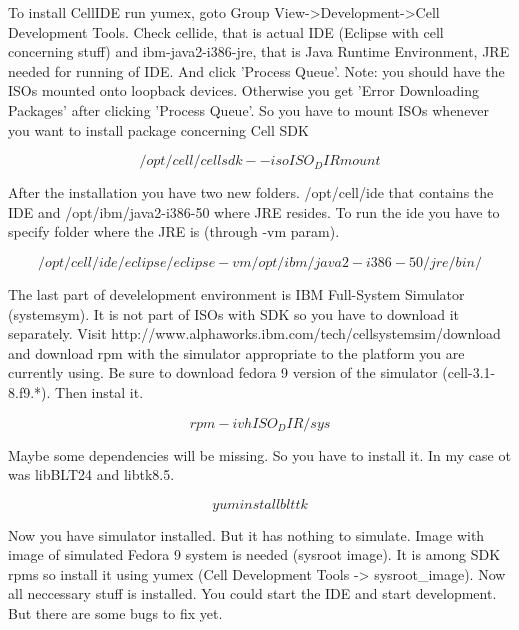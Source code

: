 \documentclass{article}
\begin{document}
To install CellIDE run yumex, goto Group View->Development->Cell Development Tools. Check cellide, that is actual IDE (Eclipse with cell concerning stuff) and ibm-java2-i386-jre, that is Java Runtime Environment, JRE needed for running of IDE. And click 'Process Queue'. Note: you should have the ISOs mounted onto loopback devices. Otherwise you get 'Error Downloading Packages' after clicking 'Process Queue'. So you have to mount ISOs whenever you want to install package concerning Cell SDK

\begin{equation}
/opt/cell/cellsdk --iso ISO_DIR mount
\end{equation}

After the installation you have two new folders. /opt/cell/ide that contains the IDE and /opt/ibm/java2-i386-50 where JRE resides. To run the ide you have to specify folder where the JRE is (through -vm param).

\begin{equation}
/opt/cell/ide/eclipse/eclipse -vm /opt/ibm/java2-i386-50/jre/bin/
\end{equation}

The last part of develelopment environment is IBM Full-System Simulator (systemsym). It is not part of ISOs with SDK so you have to download it separately. Visit http://www.alphaworks.ibm.com/tech/cellsystemsim/download and download rpm with the simulator appropriate to the platform you are currently using. Be sure to download fedora 9 version of the simulator (cell-3.1-8.f9.*). Then instal it.

\begin{equation}
rpm -ivh ISO_DIR/sys
\end{equation}

Maybe some dependencies will be missing. So you have to install it. In my case ot was libBLT24 and libtk8.5.

\begin{equation}
yum install blt tk
\end{equation}

Now you have simulator installed. But it has nothing to simulate. Image with image of simulated Fedora 9 system is needed (sysroot image). It is among SDK rpms so install it using yumex (Cell Development Tools -> sysroot_image).
Now all neccessary stuff is installed. You could start the IDE and start development. But there are some bugs to fix yet. 
\end{document}
